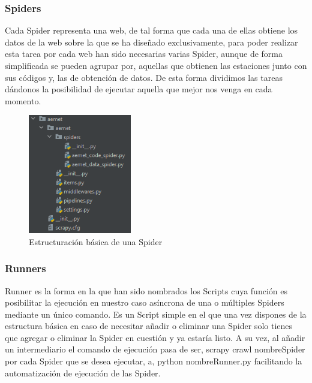 \subsubsection{Spiders}
Cada Spider representa una web, de tal forma que cada una de ellas obtiene los datos de la web sobre la que se ha diseñado exclusivamente, para poder realizar esta tarea por cada web han sido necesarias varias Spider, aunque de forma simplificada se pueden agrupar por, aquellas que obtienen las estaciones junto con sus códigos y, las de obtención de datos.\newline
De esta forma dividimos las tareas dándonos la posibilidad de ejecutar aquella que mejor nos venga en cada momento.

\begin{figure} [H]
	\centering
	\includegraphics[width=0.4\textwidth]{fig/estructura_basica_spider.png}
	\caption[Estructuración básica de una Spider]{Estructuración básica de una Spider}
	\label{fig:ej8}
\end{figure}

\subsubsection{Runners}
Runner es la forma en la que han sido nombrados los Scripts cuya función es posibilitar la ejecución en nuestro caso asíncrona de una o múltiples Spiders mediante un único comando.\newline
Es un Script simple en el que una vez dispones de la estructura básica en caso de necesitar añadir o eliminar una Spider solo tienes que agregar o eliminar la Spider en cuestión y ya estaría listo.\newline
A su vez, al añadir un intermediario el comando de ejecución pasa de ser, scrapy crawl nombreSpider por cada Spider que se desea ejecutar, a, python nombreRunner.py facilitando la automatización de ejecución de las Spider.

